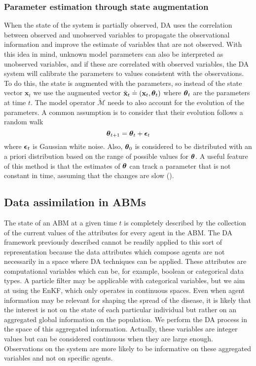 \documentclass[11pt,a4paper]{article}
\renewcommand{\v}[1]{\ensuremath{\mathbf{#1}}}
\newcommand{\gv}[1]{\ensuremath{\mbox{\boldmath$ #1 $}}}
\begin{document}
\subsubsection{Parameter estimation through state augmentation}

When the state of the system is partially observed, DA uses the correlation between observed and unobserved variables to propagate the observational information and improve the estimate of variables that are not observed.  With this idea in mind, unknown model parameters can also be interpreted as unobserved variables, and if these are correlated with observed variables, the DA system will calibrate the parameters to values consistent with the observations. To do this, the state is augmented with the parameters, so instead of the state vector $\v x_t$ we use the augmented vector $\tilde{\v x}_t\doteq (\v x_t, \gv \theta_t)$ where $\gv \theta_t$ are the parameters at time $t$. The model operator $\tilde{\mathcal M}$ needs to also account for the evolution of the parameters. A common assumption is to consider that their evolution follows a random walk
$$
\gv \theta_{t+1} = \gv \theta_t + \gv \epsilon_t
$$
where $\gv\epsilon_t$ is Gaussian white noise. Also, $\gv\theta_0$ is considered to be distributed with an a priori distribution based on the range of possible values for $\gv\theta$. A useful feature of this method is that the estimates of $\gv\theta$ can track a parameter that is not constant in time, assuming that the changes are slow (\cite{Ruiz2013}). 

\subsection{Data assimilation in ABMs} \label{sec:da_abm}

The state of an ABM  at a given time $t$ is completely described by the collection of the current values of the attributes for every agent in the ABM. The DA framework previously described cannot be readily applied to this sort of representation because the data attributes which compose agents are not necessarily in a space where DA techniques can be applied. These attributes are computational variables which can be, for example, boolean or categorical data types. A particle filter may be applicable with categorical variables, but we aim at using the EnKF, which only operates in continuous spaces. Even when agent information may be relevant for shaping the spread of the disease, it is likely that the interest is not on the state of each particular individual but rather on an aggregated global information on the population. We perform the DA process in the space of this aggregated information. Actually, these variables are integer values but can be considered continuous when they are large enough. Observations on the system are more likely to be informative on these aggregated variables and not on specific agents.
\end{document}
